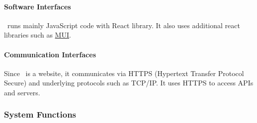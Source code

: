 \paragraph{Software Interfaces}

\afetbilgi\ runs mainly JavaScript code with React library. It also uses additional react libraries such as \href{https://mui.com/}{MUI}.

\paragraph{Communication Interfaces}

Since \afetbilgi\ is a website, it communicates via HTTPS (Hypertext Transfer Protocol Secure) and underlying protocols such as TCP/IP. It uses HTTPS to access APIs and servers.

\subsubsection{System Functions}

